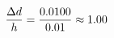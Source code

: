 \documentclass[preview]{standalone}
\begin{document}
\begin{align*}
\special{dvisvgm:raw <g id='unique000'>}\frac{\Delta d}{h} = \frac{0.0100}{0.01} \approx 1.00\special{dvisvgm:raw </g>}
\end{align*}
\end{document}
